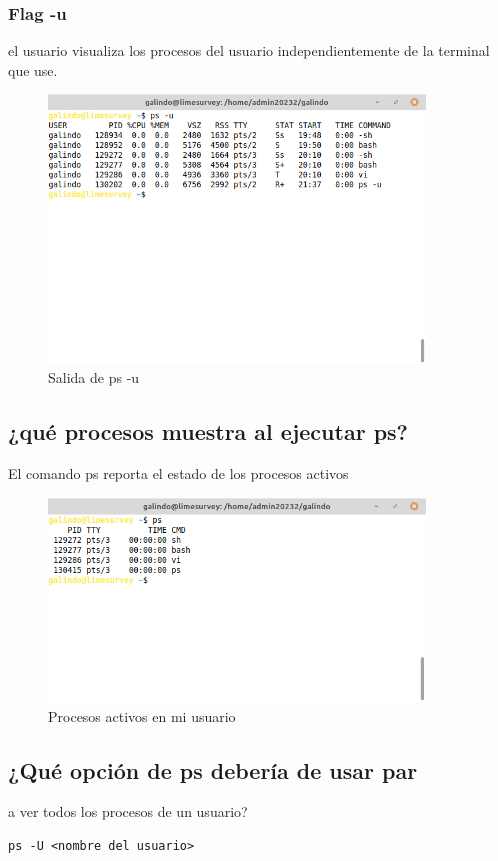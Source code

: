 \documentclass[11pt]{article}
\begin{document}
\subsubsection*{Flag -u}
\label{sec:orgc1a2b4b}
el usuario visualiza los procesos del usuario independientemente de la terminal
que use.

\begin{figure}[htbp]
\centering
\includegraphics[width=10cm]{img/mu.png}
\caption{Salida de ps -u}
\end{figure}

\subsection{¿qué procesos muestra al ejecutar ps?}
\label{sec:org8bf8059}
El comando ps reporta el estado de los procesos activos

\begin{figure}[htbp]
\centering
\includegraphics[width=10cm]{img/ps.png}
\caption{Procesos activos en mi usuario}
\end{figure}

\subsection{¿Qué opción de ps debería de usar par}
\label{sec:org26019ec}
a ver todos los procesos de un usuario?
\begin{verbatim}
ps -U <nombre del usuario>
\end{verbatim}
\end{document}
